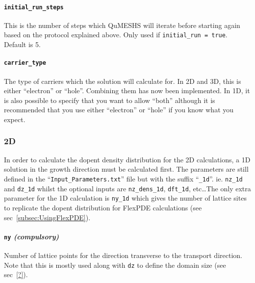 \documentclass[12pt]{article}
\newcommand{\red}[1]{{\color{red} \it #1}}
\newcommand{\commentout}[1]{}
\begin{document}
\paragraph{\texttt{initial\_run\_steps}}
This is the number of steps which QuMESHS will iterate before starting again based on
the protocol explained above.  Only used if \texttt{initial\_run = true}.  Default is
5.

\paragraph{\texttt{carrier\_type}}
The type of carriers which the solution will calculate for.  In 2D and 3D, this is either
``electron'' or ``hole''.  Combining them has now been implemented.  In 1D, it is also possible
to specify that you want to allow ``both'' although it is recommended that you use either
``electron'' or ``hole'' if you know what you expect.

\commentout{
\subsubsection{1D}

\red{I cannot think of any 1D specific input parameters\ldots}
}

\subsubsection{2D}

In order to calculate the dopent density distribution for the 2D calculations, a 1D
solution in the growth direction must be calculated first.  The parameters are still
defined in the ``\texttt{Input\_Parameters.txt}'' file but with the suffix ``\texttt{\_1d}''.
ie. \texttt{nz\_1d} and \texttt{dz\_1d} whilst the optional inputs are \texttt{nz\_dens\_1d},
\texttt{dft\_1d}, etc\ldots  The only extra parameter for the 1D calculation is
\texttt{ny\_1d} which gives the number of lattice sites to replicate the dopent distribution
for FlexPDE calculations (see sec~\ref{subsec:UsingFlexPDE}).

\paragraph{\texttt{ny} \emph{(compulsory)}}
Number of lattice points for the direction transverse to the transport direction.  Note
that this is mostly used along with \texttt{dz} to define the domain size (see sec~\ref{?}).
\end{document}
